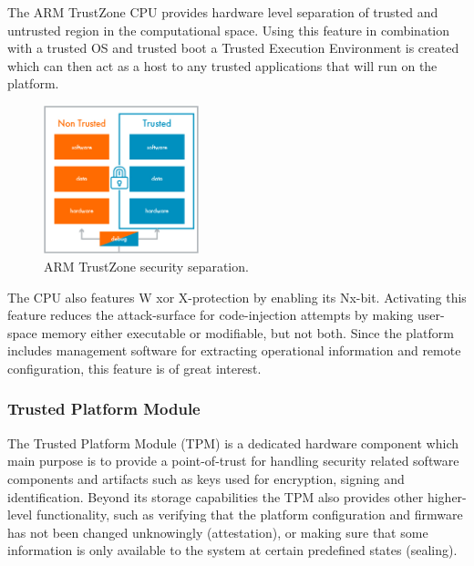 \documentclass[10pt]{article}
\begin{document}
        The ARM TrustZone CPU provides hardware level separation of trusted and
        untrusted region in the computational space. Using this feature in
        combination with a trusted OS and trusted boot a Trusted Execution
        Environment is created which can then act as a host to any trusted
        applications that will run on the platform.

        \begin{figure}[!h]
          \center
          \includegraphics[width=0.4\textwidth]{input/arm_trust.jpg}
          \caption{ARM TrustZone security separation.}
        \end{figure}

        The CPU also features W xor X-protection by enabling its Nx-bit.
        Activating this feature reduces the attack-surface for code-injection
        attempts by making user-space memory either executable or modifiable,
        but not both. Since the platform includes management software for
        extracting operational information and remote configuration, this
        feature is of great interest.

      \subsubsection{Trusted Platform Module}

        The Trusted Platform Module (TPM) is a dedicated hardware component
        which main purpose is to provide a point-of-trust for handling security
        related software components and artifacts such as keys used for
        encryption, signing and identification. Beyond its storage
        capabilities the TPM also provides other higher-level functionality,
        such as verifying that the platform configuration and firmware has not
        been changed unknowingly (attestation), or making sure that some information
        is only available to the system at certain predefined states (sealing).
\end{document}
